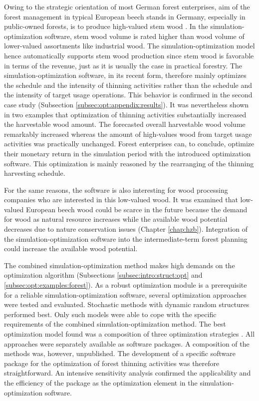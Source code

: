 Owing to the strategic orientation of most German forest enterprises, aim of the forest management in typical European beech stands in Germany, especially in public-owned forests, is to produce high-valued stem wood \citep{nagel_2008}. In the simulation-optimization software, stem wood volume is rated higher than wood volume of lower-valued assortments like industrial wood. The simulation-optimization model hence automatically supports stem wood production since stem wood is favorable in terms of the revenue, just as it is usually the case in practical forestry. The simulation-optimization software, in its recent form, therefore mainly optimizes the schedule and the intensity of thinning activities rather than the schedule and the intensity of target usage operations. This behavior is confirmed in the second case study (Subsection \ref{subsec:opt:appendix:results}). It was nevertheless shown in two examples that optimization of thinning activities substantially increased the harvestable wood amount. The forecasted overall harvestable wood volume remarkably increased whereas the amount of high-values wood from target usage activities was practically unchanged. Forest enterprises can, to conclude, optimize their monetary return in the simulation period with the introduced optimization software. This optimization is mainly reasoned by the rearranging of the thinning harvesting schedule.

For the same reasons, the software is also interesting for wood processing companies who are interested in this low-valued wood. It was examined that low-valued European beech wood could be scarce in the future because the demand for wood as natural resource increases while the available wood potential decreases due to nature conservation issues (Chapter \ref{chap:hzb}). Integration of the simulation-optimization software into the intermediate-term forest planning could increase the available wood potential.

The combined si\-mu\-la\-tion-op\-ti\-mi\-za\-tion method makes high demands on the optimization algorithm (Subsections \ref{subsec:intro:struct:opt} and \ref{subsec:opt:examples:forest}). As a robust optimization module is a prerequisite for a reliable si\-mu\-la\-tion-op\-ti\-mi\-za\-tion software, several optimization approaches were tested and evaluated. Stochastic methods with dynamic random structures performed best. Only such models were able to cope with the specific requirements of the combined si\-mu\-la\-tion-op\-ti\-mi\-za\-tion method. The best optimization model found was a composition of three optimization strategies \citep{corana_1987, kirkpatrick_1983, pronzato_1984}. All approaches were separately available as software packages. A composition of the methods was, however, unpublished. The development of a specific software package for the optimization of forest thinning activities was therefore straightforward. An intensive sensitivity analysis confirmed the applicability and the efficiency of the package as the optimization element in the si\-mu\-la\-tion-op\-ti\-mi\-za\-tion software.

